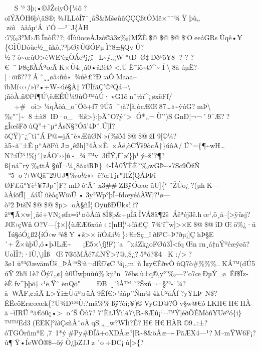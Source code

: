 S'³
3þ;•©JŽciyÕ\{¼ô?oïÝÄÔH6þ\textbackslash ãS®;¾JLL\textbar óÍ7¯¸âŠ\&MšøûûÇÇÇßtÓMë×¯¯¾Ÿþù„
zöìàååµ`Áï'Ó---²¯J\{ÀH
:7‰3°M›ÆÎnòÉ\textquotesingle??;4ÎùûoœÅJzò©â3z‰†MŽÈ\$@\$@\$@\$`OeeåGRsÙqê•¥\{GÌÛÐóùe½\_ükô‚?³þØÿÛ®ÓFµÌ?8±§QvÛ?½?ò\textasciitilde œùO\textgreater èWE`ègÒÁeªj¿ïL\textasciitilde ý„¡W*tÐ~Ø‡DðºöY8
?  ?  ?€¨Þ8çßÀÁªœÂK×Û4:¸â0•âßèØ
\textless.ÜÊ¯iô\textasciitilde Ø\^{}\textasciitilde{}
Í\textbackslash8àúµË?­{[}·öïß???Áˆ¸¸øâ‹ñú«¯¾úè£?Ð:aÓ¦Maaa--îbMí‹‹‹/»ì²•+W\textasciitilde úé§Ã‡7ÚÌƒäÇ'©²Qá¬\textbackslash¡ñòÀ.ñ©ƒ³ƒ¶Ú\textbackslash ëÆÉÛ¼9ùÕ™ùÛ·vG1õnˆ½ï\^{}¿øxëFf/
÷\#~oì\textgreater¼qÀòà\_o¯Öõ+ƒ7
9Ú5¯‹à?{[}ã,òcÆŒ87\ldots«\textasciitilde ýúG?mÞ\textbackslash‰"¨{]}\textasciitilde{}8±à8IÐ·o\_¾š\textgreater\}:þÄ˜O?ý´\textgreater{}
Ó*,,¬Ù'')SGnÐ¦¬¬'9¯Æ??gÎœšFðùQ''+¯µ``ÂsN§?Óä'\textquotesingle4Þˆ.Ú{]}I?õÇŸ)¯¿\^{}tì˜ÁP@=jÄˆè»ÆûØN»(\%šM\$@\$@žI
9{[}©¼?à5\textasciitilde ã¨±Êµ``AðFûJ¤¸êßh{]}?4À×È×Âë,òCŸš9òcÃ†\}úôA/Ü˜=\{¶\textasciitilde wH\ldots N?:íÙ³!\%j´†zÁO'››{[}û-\_¾™v3fÌ\textquotesingle Ÿ\textbar‚ƒ\^{}øí\}þ¹ý--ž"?¶\textbar*?ß\{ná\^{}rÿ‰ttÁ§úÏ¬¼¸8ã»ïRÞ\}¯4-ÍÀ0ŸÈÈ˜‰wGÞ\textasciitilde»7Sc9ÕžÑ

°5o?›WQã¯29UJ¶‰o½«›ê?œTjr*HŽ¦QÁÞÞî--ØF£ü°Yè¹¥7 Jp¨{]}F?mÐò`Äˆx3\#\#ZBÿÓœœ\textbar{]}{]}ûU{]}\{`
¨ŽÛo¿?(µhK---àÂíõƒÎ{[}\_ááÚûèåçWïöÛ•3y²Wp°þÎ--fdœyéåÃW{]}?¹ø---ò²2ÞtšN\$@\$@\$p\textgreateroÀ§ñÍ¦OÿüßÐÙk»ì¦î?žº¶Ã×w{]}¸ãé+VN¿øƒa=î¹¤õÅíâ8Î\$þ\&÷µÎäÎVÁ8ä¶2šÁëªéj3ë.hœ¹‚ö¸å--{[}\textgreater ÿüsj?JŒ›çWñO?V---{[}‡×{]}\{ùÆÆ6xúé‹‡{]}nH¦`÷îã£Ç7¾`ï\^{}w{]}\textgreater×E\$@\$@îD Œö\%¿·ü
\textbarÏú§óÓ¿ß2\{íÓ‹w³é\$Y•š\textgreater×ìïÓ£i½\}›¾rSç\_îðß³C--Þ?ðµ¡{]}ÇhÞ§E´+Ž×ùþÚ,ó•þJLÆ\textasciitilde¡Ë5×\textbackslash ƒj!F)¨a\^{}xáZk¿oFØú3Ï\textless ƒqŒn
rn¸á†nÝºéæýøã?UoÌÎ?;·lÙ‚\textbar\textbackslash jÎßŒ7®öMÂé7£NŸ\textgreater?@\textbar\textbar„\$¿?5ªó?®4~
K
:/\textgreater?3ø1ü°³Øæ\textbar vämÙš\_ÞÀ`ªŠ`ñ¬dËƒ7¢C¼¡„m¨ñÍ¢y€ÊðvÒûQ7ò\#\%\%\%..KÁ™(dÚ5úŸ2h!î1è?Öý7„¢‡ù0Úwþüùú\%kji²n
7ébs.ù±q®,y°'‰---?'o7œÐµÝ\_øÊƒ\$Ïz­èÈƒv\^{}þþõ†‹¹ë.ŸˆënQö" 
ÐB~¸´ìÀ™ˆ?Šxñ¬=§²²-¯¼?àWÄF‚¢:âÂL\textgreater Ýi±Ùúº¤üÀ9Êƒ€\textgreater'áâp''Ñm@4kÙ²åÁƒ?yŸLÞ~N\$?ÊËeöEræœœk\{?Ü¾Ð™Ù:?må\%\%ßÿ?òî;¥)©VyGD@?Ôv§w@€óLKH€H€HÀ-
ä--ìIRÜªä€ö0ç •\textgreater{}
o´ŠÕù7?7"ÈãJŸi¼7\textbackslash R\textasciitilde8Æû¡`¬™Ý{]}éðÕÉMòñ¥Uëºó\{i\}™™Ëd3(ËËK{[}°àìÇsñÂ ˆoÃqS¦„\_w?WÍi?É?H€H€HÀR©9\ldots:±?óTGÓrñmªE‚7~1*ý\#Py\#ÐÏå+oXDÀæ?{]}R\textasciitilde8\&öÃæ¬-PãÆX4---¹?M--mŸW6F¡?û¶Ÿ•ÍeWÕ®\$-\/-õýÒ¿þZJJz´o÷ÐC¡ú{[}\textgreater*\{? 
